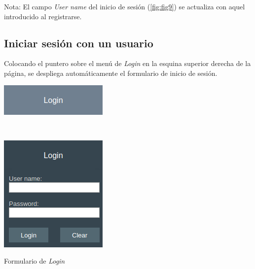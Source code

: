 \documentclass{article}
\newcommand{\myarrow}{\ding{223}}
\begin{document}
Nota: El campo \textit{User name} del inicio de sesión (\autoref{fig:fig9}) se actualiza con aquel introducido al registrarse.
\subsection{Iniciar sesión con un usuario}
Colocando el puntero sobre el menú de \textit{Login} en la esquina superior derecha de la página, se despliega automáticamente el formulario de inicio de sesión.
\vspace{-12pt}
\begin{center}
    \begin{minipage}[t][][b]{.275\linewidth}
        \includegraphics[width=.91\linewidth]{login1}
    \end{minipage}
    \raisebox{-2.33\height}{\scalebox{2}{\myarrow}}$\;$
    \begin{minipage}[t][][b]{.275\linewidth}
        \centering
        \captionsetup{type=figure}
        \includegraphics[width=.91\linewidth]{fig9}
        \caption{Formulario de \textit{Login}}
        \label{fig:fig9}
    \end{minipage}
\end{center}
\end{document}

